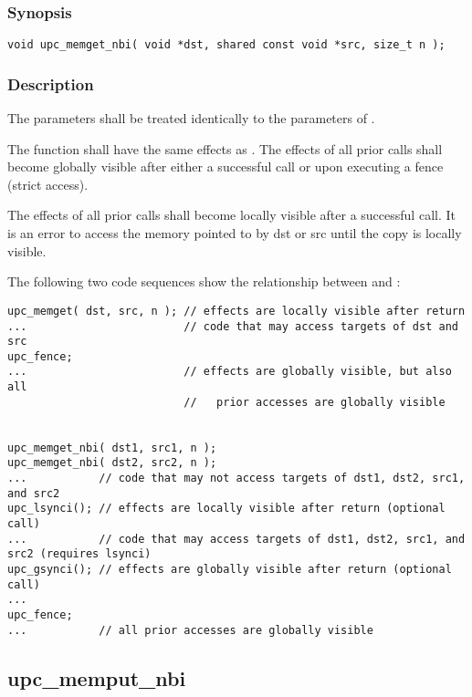 \subsubsection{Synopsis}

\begin{verbatim}
void upc_memget_nbi( void *dst, shared const void *src, size_t n );
\end{verbatim}

\subsubsection{Description}

\npf The parameters shall be treated identically to the parameters of
\memget{}.

\np The \function{} function shall have the same effects as \memget{}.
The effects of all prior \function{} calls shall become globally visible after 
either a successful \gsynci{} call or upon executing a fence (strict access).

\np The effects of all prior \function{} calls shall become locally 
visible after a successful \lsynci{} call.  It is an error to access the memory
pointed to by dst or src until the copy is locally visible.

\np The following two code sequences show the relationship between
\memget{} and \function{}:

\begin{verbatim}
upc_memget( dst, src, n ); // effects are locally visible after return
...                        // code that may access targets of dst and src
upc_fence;                 
...                        // effects are globally visible, but also all
                           //   prior accesses are globally visible


upc_memget_nbi( dst1, src1, n );
upc_memget_nbi( dst2, src2, n );
...           // code that may not access targets of dst1, dst2, src1, and src2
upc_lsynci(); // effects are locally visible after return (optional call)
...           // code that may access targets of dst1, dst2, src1, and src2 (requires lsynci)
upc_gsynci(); // effects are globally visible after return (optional call)
...
upc_fence;
...           // all prior accesses are globally visible
\end{verbatim}

\newpage
\subsection{upc\_memput\_nbi}
\def\function{{\tt upc\_memput\_nbi}}

